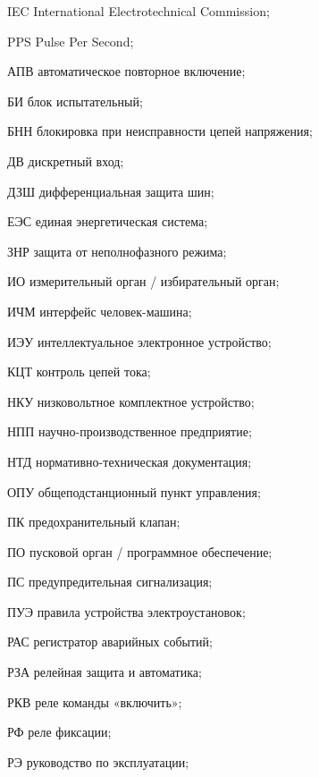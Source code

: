 \begin{list}{}%
{%
  \setlength{\labelwidth}{\abbrwidth}%
  \setlength{\labelsep}{0pt}%
  \setlength{\leftmargin}{\dimexpr\labelwidth+\labelsep\relax}%
  \setlength{\itemindent}{0pt}%
  \setlength{\parsep}{0pt}%
  \setlength{\itemsep}{0pt}
  \renewcommand{\makelabel}[1]{#1 --\hspace{\abbrgap}}%
}
\item[IEC]  International Electrotechnical Commission;
\item[PPS] Pulse Per Second;
\item[АПВ] автоматическое повторное включение;
\item[БИ] блок испытательный;
\item[БНН] блокировка при неисправности цепей напряжения;
\item[ДВ] дискретный вход;
\item[ДЗШ] дифференциальная защита шин;
\item[ЕЭС] единая энергетическая система;
\item[ЗНР] защита от неполнофазного режима;
\item[ИО] измерительный орган / избирательный орган;
\item[ИЧМ] интерфейс человек-машина;
\item[ИЭУ] интеллектуальное электронное устройство;
\item[КЦТ] контроль цепей тока;
\item[НКУ] низковольтное комплектное устройство;
\item[НПП] научно-производственное предприятие;
\item[НТД] нормативно-техническая документация;
\item[ОПУ] общеподстанционный пункт управления;
\item[ПК] предохранительный клапан;
\item[ПО] пусковой орган / программное обеспечение;
\item[ПС] предупредительная сигнализация;
\item[ПУЭ] правила устройства электроустановок;
\item[РАС] регистратор аварийных событий;
\item[РЗА] релейная защита и автоматика;
\item[РКВ] реле команды «включить»;
\item[РФ] реле фиксации;
\item[РЭ] руководство по эксплуатации;

\end{list}
